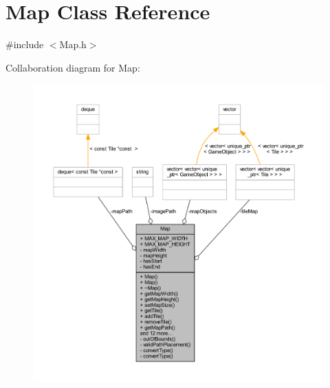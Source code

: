 \hypertarget{class_map}{\section{Map Class Reference}
\label{class_map}
}


{\ttfamily \#include $<$Map.\+h$>$}



Collaboration diagram for Map\+:
\nopagebreak
\begin{figure}[H]
\begin{center}
\leavevmode
\includegraphics[width=350pt]{class_map__coll__graph}
\end{center}
\end{figure}

